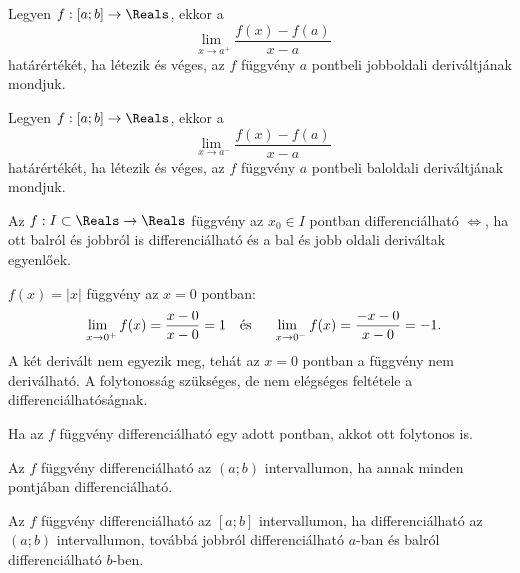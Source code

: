 \begin{definition}
  Legyen $f:[a; b] \rightarrow \Reals$, ekkor a
  \[
    \lim_{\phantom{{}^{+}}x \to a^+} \frac{f(x)-f(a)}{x-a}
  \]
  határértékét, ha létezik és véges, az $f$ függvény $a$ pontbeli jobboldali
  deriváltjának mondjuk.
\end{definition}

\begin{definition}
  Legyen $f:[a; b] \rightarrow \Reals$, ekkor a
  \[
    \lim_{\phantom{{}^{-}}x \to a^-} \frac{f(x)-f(a)}{x-a}
  \]
  határértékét, ha létezik és véges, az $f$ függvény $a$ pontbeli baloldali
  deriváltjának mondjuk.
\end{definition}

\begin{note}
  Az $f: I\subset \Reals \rightarrow \Reals$ függvény az $x_0\in I$ pontban
  differenciálható $\Leftrightarrow$, ha ott balról és jobbról is
  differenciálható és a bal és jobb oldali deriváltak egyenlőek.
\end{note}

\begin{example}
  $f(x) = |x|$ függvény az $x = 0$ pontban:
  \[
    \lim_{\phantom{{}^{+}}x \to 0^+} f(x) = \frac{x-0}{x-0} = 1
    \quad \text{és} \quad
    \lim_{\phantom{{}^{+}}x \to 0^-} f(x) = \frac{-x-0}{x-0} = -1
    \text.
  \]
  A két derivált nem egyezik meg, tehát az $x = 0$ pontban a függvény nem
  deriválható. A folytonosság szükséges, de nem elégséges feltétele a
  differenciálhatóságnak.
\end{example}

\begin{theorem}
  Ha az $f$ függvény differenciálható egy adott pontban, akkot ott folytonos is.
\end{theorem}

\begin{definition}
  Az $f$ függvény differenciálható az $(a; b)$ intervallumon, ha annak minden
  pontjában differenciálható.
\end{definition}

\begin{definition}
  Az $f$ függvény differenciálható az $[a; b]$ intervallumon, ha
  differenciálható az $(a; b)$ intervallumon, továbbá jobbról differenciálható
  $a$-ban és balról differenciálható $b$-ben.
\end{definition}

